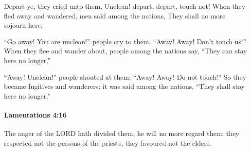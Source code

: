 			\begin{versebox}
					\item[BHS] 
					\item[LXX] 
					\item[ASV] Depart ye, they cried unto them, Unclean! depart, depart, touch not! When they fled away and wandered, men said among the nations, They shall no more sojourn here.
					\item[NIV] “Go away! You are unclean!” people cry to them. “Away! Away! Don’t touch us!” When they flee and wander about, people among the nations say, “They can stay here no longer.”
					\item[NRSV] “Away! Unclean!” people shouted at them; “Away! Away! Do not touch!” So they became fugitives and wanderers; it was said among the nations, “They shall stay here no longer.”
			\end{versebox}

		\paragraph{Lamentations 4:16} %
			\label{LAMENTATIONS-4-16}

			The anger of the LORD hath divided them; he will no more regard them: they respected not the persons of the priests, they favoured not the elders.

